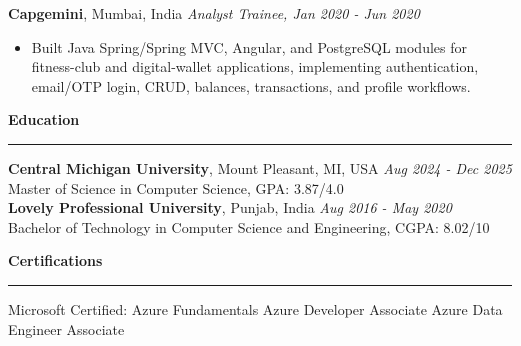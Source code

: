 \documentclass[11pt,letterpaper]{article}
\newcommand{\ressection}[1]{\Needspace{6\baselineskip}\vspace{8pt}\par\textbf{#1}\par\vspace{2pt}\hrule\vspace{5pt}}
\begin{document}
\textbf{Capgemini}, Mumbai, India \hfill \textit{Analyst Trainee, Jan 2020 - Jun 2020}
\begin{itemize}
  \item Built Java Spring/Spring MVC, Angular, and PostgreSQL modules for fitness-club and digital-wallet applications, implementing authentication, email/OTP login, CRUD, balances, transactions, and profile workflows.
\end{itemize}

\ressection{Education}
\textbf{Central Michigan University}, Mount Pleasant, MI, USA \hfill \textit{Aug 2024 - Dec 2025}\\
Master of Science in Computer Science, GPA: 3.87/4.0\\[2pt]
\textbf{Lovely Professional University}, Punjab, India \hfill \textit{Aug 2016 - May 2020}\\
Bachelor of Technology in Computer Science and Engineering, CGPA: 8.02/10

\ressection{Certifications}
Microsoft Certified: Azure Fundamentals \textbar{} Azure Developer Associate \textbar{} Azure Data Engineer Associate
\end{document}
